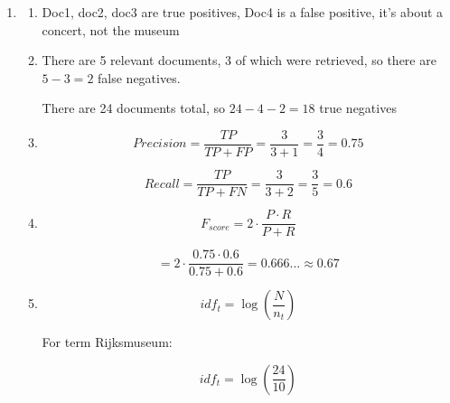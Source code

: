 \documentclass[11pt]{article}
\begin{document}
\begin{enumerate}
\begin{enumerate}
\[
\cos(\widehat{doc2,q})=\frac{1}{\sqrt{5}\cdot\sqrt{3}}=0.2581...\approx0.258
\]

\[
\cos(\widehat{doc3,q})=\frac{1}{\sqrt{5}\cdot\sqrt{3}}\approx0.258
\]

\[
\cos(\widehat{doc4,q})=\frac{1}{\sqrt{3}\cdot\sqrt{3}}=0.333...\approx0.333
\]

\item

For this query and document collection, the dot product similarity ranks doc1 as the most similar to the query, and doc 2,3,4 as equally similar to each other.

The cosine equality ranks most similar to be doc2=doc3$<$doc4$<$doc1

The difference in this case is not huge, both methods result in doc1 having the highest similarity. But the cosine similarity values rank 4 higher than 2,3, while 4 is intuitively less similar to the query.

\end{enumerate}

\item

\begin{enumerate}

\item
Doc1, doc2, doc3 are true positives, Doc4 is a false positive, it's about a concert, not the museum

\item
There are 5 relevant documents, 3 of which were retrieved, so there are $5-3=2$ false negatives.

There are 24 documents total, so $24-4-2=18$ true negatives

\item

\[
Precision=\frac{TP}{TP+FP}=\frac{3}{3+1}=\frac{3}{4}=0.75
\]

\[
Recall=\frac{TP}{TP+FN}=\frac{3}{3+2}=\frac{3}{5}=0.6
\]

\item

\[
F_{score}=2\cdot\frac{P\cdot R}{P+R}
\]

\[
=2\cdot\frac{0.75\cdot0.6}{0.75+0.6}
=0.666...\approx0.67
\]

\item

\[
idf_t=\log\left(\frac{N}{n_t}\right)
\]

For term Rijksmuseum:

\[
idf_t=\log\left(\frac{24}{10}\right)
\]


\end{enumerate}
\end{enumerate}
\end{document}
